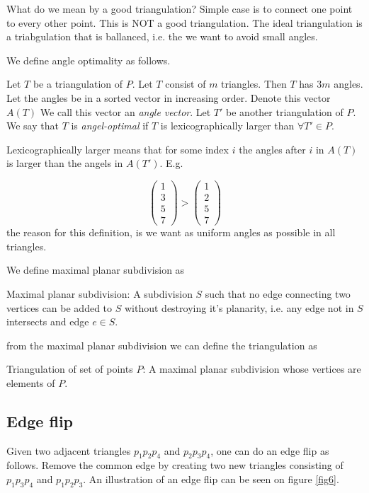 \documentclass[10pt]{article}
\begin{document}
What do we mean by a good triangulation?
Simple case is to connect one point to every other point. This is NOT a good triangulation. The ideal triangulation is a triabgulation that is ballanced, i.e. the we want to avoid small angles. 

We define angle optimality as follows.

Let $T$ be a triangulation of $P$. Let $T$ consist of $m$ triangles. Then $T$ has $3m$ angles. Let the angles be in a sorted vector in increasing order. Denote this vector $A(T)$ We call this vector an \emph{angle vector}. Let $T'$ be another triangulation of $P$. We say that $T$ is \emph{angel-optimal} if $T$ is lexicographically larger than $\forall T'\in P$.

Lexicographically larger means that for some index $i$ the angles after $i$ in $A(T)$ is larger than the angels in $A(T')$. E.g.

\begin{equation} 
\left(
\begin{array}{r} 
   1  \\
   3 \\
   5 \\
   7 
\end{array} 
\right) >   
\left(
\begin{array}{r} 
   1  \\
   2 \\
   5 \\
   7 
\end{array} 
\right)
\end{equation} 
the reason for this definition, is we want as uniform angles as possible in all triangles.


We define maximal planar subdivision as
\begin{definition}
Maximal planar subdivision: A subdivision $S$ such that no edge connecting two vertices can be added to $S$ without destroying it's planarity, i.e. any edge not in $S$ intersects and edge $e \in S$.  
\end{definition}
from the maximal planar subdivision we can define the triangulation as
\begin{definition}
Triangulation of set of points $P$: A maximal planar subdivision whose vertices are elements of $P$.  
\end{definition}




\subsection{Edge flip} %
\label{sub:edge_flip}
Given two adjacent triangles $p_1 p_2 p_4$ and $p_2 p_3 p_4$, one can do an edge flip as follows. Remove the common edge by creating two new triangles consisting of $p_1 p_3 p_4$ and $p_1 p_2 p_3$. An illustration of an edge flip can be seen on figure \ref{fig6}.
\end{document}
